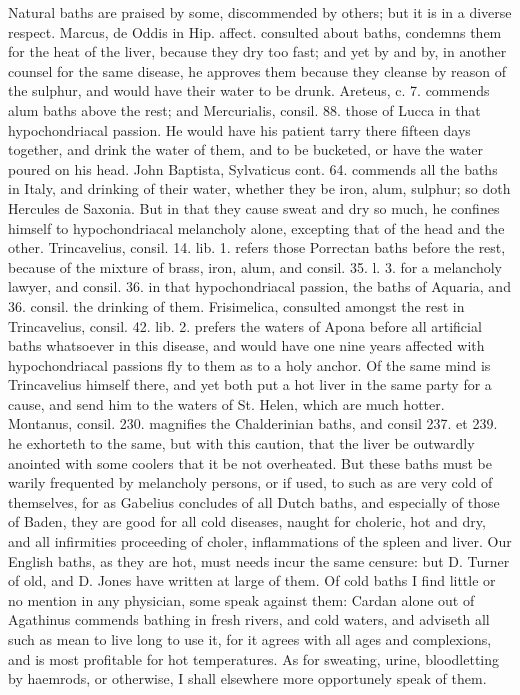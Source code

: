 {Natural baths are praised by some, discommended by others; but it is in
a diverse respect. Marcus, de Oddis in Hip. affect. consulted
about baths, condemns them for the heat of the liver, because they dry
too fast; and yet by and by, in another counsel for the same
disease, he approves them because they cleanse by reason of the
sulphur, and would have their water to be drunk. Areteus, c. 7.
commends alum baths above the rest; and Mercurialis, consil. 88.
those of Lucca in that hypochondriacal passion. He would have his
patient tarry there fifteen days together, and drink the water of them,
and to be bucketed, or have the water poured on his head. John
Baptista, Sylvaticus cont. 64. commends all the baths in Italy, and
drinking of their water, whether they be iron, alum, sulphur; so doth
Hercules de Saxonia. But in that they cause sweat and dry so
much, he confines himself to hypochondriacal melancholy alone,
excepting that of the head and the other. Trincavelius, consil. 14.
lib. 1. refers those Porrectan baths before the rest, because of
the mixture of brass, iron, alum, and consil. 35. l. 3. for a
melancholy lawyer, and consil. 36. in that hypochondriacal passion, the
baths of Aquaria, and 36. consil. the drinking of them.
Frisimelica, consulted amongst the rest in Trincavelius, consil. 42.
lib. 2. prefers the waters of Apona before all artificial baths
whatsoever in this disease, and would have one nine years affected with
hypochondriacal passions fly to them as to a holy anchor. Of the
same mind is Trincavelius himself there, and yet both put a hot liver
in the same party for a cause, and send him to the waters of St. Helen,
which are much hotter. Montanus, consil. 230. magnifies the
Chalderinian baths, and consil 237. et 239. he exhorteth to the
same, but with this caution, that the liver be outwardly anointed
with some coolers that it be not overheated. But these baths must be
warily frequented by melancholy persons, or if used, to such as are
very cold of themselves, for as Gabelius concludes of all Dutch baths,
and especially of those of Baden, they are good for all cold diseases,
naught for choleric, hot and dry, and all infirmities proceeding
of choler, inflammations of the spleen and liver. Our English baths, as
they are hot, must needs incur the same censure: but D. Turner of old,
and D. Jones have written at large of them. Of cold baths I find little
or no mention in any physician, some speak against them: Cardan
alone out of Agathinus commends bathing in fresh rivers, and cold
waters, and adviseth all such as mean to live long to use it, for it
agrees with all ages and complexions, and is most profitable for hot
temperatures. As for sweating, urine, bloodletting by haemrods, or
otherwise, I shall elsewhere more opportunely speak of them.

}
